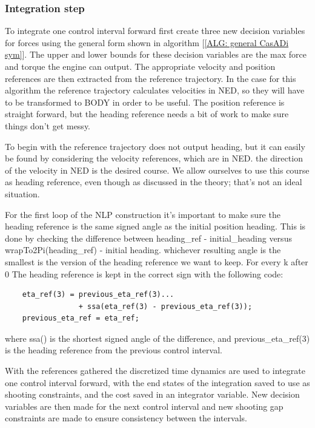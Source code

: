 \subsubsection*{Integration step}
To integrate one control interval forward first create three new decision variables for forces using the general form
shown in algorithm [\ref{ALG: general CasADi sym}]. The upper and lower bounds for these decision variables are the max force and torque
the engine can output. The appropriate velocity and position references are then extracted from the reference trajectory. In the case
for this algorithm the reference trajectory calculates velocities in NED, so they will have to be transformed to BODY in order to be useful.
The position reference is straight forward, but the heading reference needs a bit of work to make sure things don't get messy.

To begin with the reference trajectory does not output heading, but it can easily be found by considering the velocity references, which are in NED.
the direction of the velocity in NED is the desired course. We allow ourselves to use this course as heading reference, even though as discussed in the theory;
that's not an ideal situation.

For the first loop of the \gls{NLP} construction it's important to make sure the heading reference is the same signed angle as the initial position heading.
This is done by checking the difference between heading\_ref - initial\_heading versus wrapTo2Pi(heading\_ref) - initial heading. whichever resulting angle is the smallest
is the version of the heading reference we want to keep. For every k after 0 The heading reference is kept in the correct sign with the following code:
\begin{lstlisting}
    eta_ref(3) = previous_eta_ref(3)...
                 + ssa(eta_ref(3) - previous_eta_ref(3));
    previous_eta_ref = eta_ref; 
\end{lstlisting}
where ssa() is the shortest signed angle of the difference, and previous\_eta\_ref(3) is the heading reference from the previous control interval.

With the references gathered the discretized time dynamics are used to integrate one control interval forward, with the end states of the integration
saved to use as shooting constraints, and the cost saved in an integrator variable. New decision variables are then made for the next control interval and
new shooting gap constraints are made to ensure consistency between the intervals.

